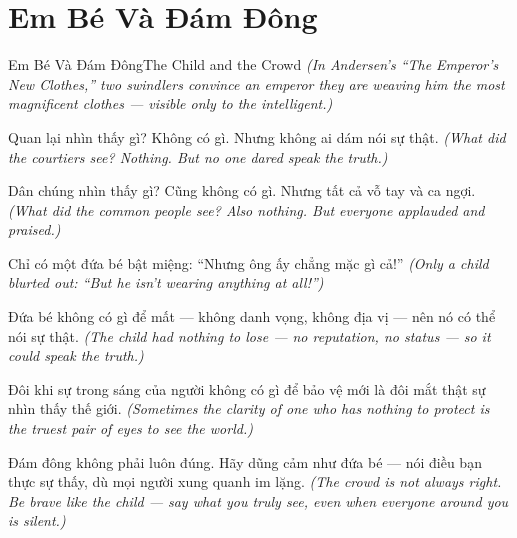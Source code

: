 \section{Em Bé Và Đám Đông}
\begin{truyen}{Em Bé Và Đám Đông}{The Child and the Crowd}
\textit{(In Andersen's ``The Emperor's New Clothes,'' two swindlers convince an emperor they are weaving him the most magnificent clothes — visible only to the intelligent.)}

Quan lại nhìn thấy gì? Không có gì. Nhưng không ai dám nói sự thật.
\textit{(What did the courtiers see? Nothing. But no one dared speak the truth.)}

Dân chúng nhìn thấy gì? Cũng không có gì. Nhưng tất cả vỗ tay và ca ngợi.
\textit{(What did the common people see? Also nothing. But everyone applauded and praised.)}

Chỉ có một đứa bé bật miệng: ``Nhưng ông ấy chẳng mặc gì cả!''
\textit{(Only a child blurted out: ``But he isn't wearing anything at all!'')}

Đứa bé không có gì để mất — không danh vọng, không địa vị — nên nó có thể nói sự thật.
\textit{(The child had nothing to lose — no reputation, no status — so it could speak the truth.)}

Đôi khi sự trong sáng của người không có gì để bảo vệ mới là đôi mắt thật sự nhìn thấy thế giới.
\textit{(Sometimes the clarity of one who has nothing to protect is the truest pair of eyes to see the world.)}

\end{truyen}

\begin{baihoc}
Đám đông không phải luôn đúng. Hãy dũng cảm như đứa bé — nói điều bạn thực sự thấy, dù mọi người xung quanh im lặng.
\textit{(The crowd is not always right. Be brave like the child — say what you truly see, even when everyone around you is silent.)}
\end{baihoc}
\ngancach

